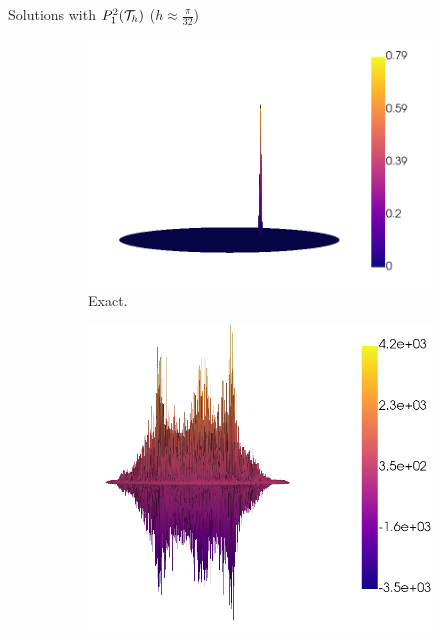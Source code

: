 			\begin{frame}{Solutions with $\relax{P}_1^2(\mathcal{T}_h)$ ($h\approx\frac{\pi}{32}$)}
				\vspace*{-0.5cm}
				\begin{figure}[h!]
					\begin{subfigure}[b]{0.49\textwidth}
						\centering
						\includegraphics[scale=0.16]{img/Conveccion_Reaccion/strong/conv_react_u_ex_nx-64.png}
						\caption{Exact.}
					\end{subfigure}
					\begin{subfigure}[b]{0.49\textwidth}
						\centering
						\includegraphics[scale=0.16]{img/Conveccion_Reaccion/strong/conv_react_u_FE_nx-64.png}

\end{subfigure}
\end{figure}
\end{frame}
